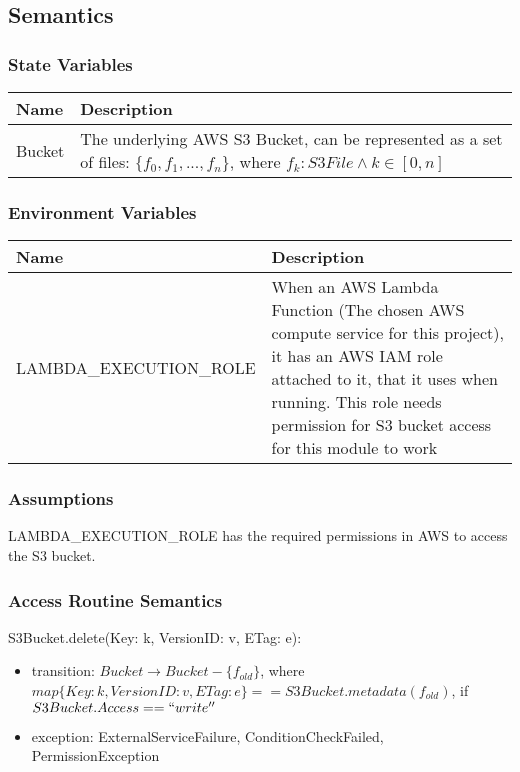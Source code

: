 \documentclass[12pt, titlepage]{article}
\begin{document}
\subsection{Semantics}

\subsubsection{State Variables}

\begin{center}
  \begin{tabular}{p{4cm} p{12cm}}
    \hline
    \textbf{Name} & \textbf{Description} \\
    \hline
    Bucket & The underlying AWS S3 Bucket, can be represented
    as a set of files: $\{f_0, f_1, ..., f_n\}$, where $f_k: S3File
    \land k\in[0,n]$ \\
    \hline
  \end{tabular}
\end{center}

\subsubsection{Environment Variables}

\begin{center}
  \begin{tabular}{p{6cm} p{10cm}}
    \hline
    \textbf{Name} & \textbf{Description} \\
    \hline
    LAMBDA\_EXECUTION\_ROLE & When an AWS Lambda Function (The chosen
    AWS compute service for this project), it has an AWS IAM role
    attached to it, that it uses when running. This role needs
    permission for S3 bucket access for this module to work \\
    \hline
  \end{tabular}
\end{center}

\subsubsection{Assumptions}

LAMBDA\_EXECUTION\_ROLE has the required permissions in AWS to access
the S3 bucket.

\subsubsection{Access Routine Semantics}

\noindent S3Bucket.delete(Key: k, VersionID: v, ETag: e):
\begin{itemize}
  \item transition: $Bucket \rightarrow Bucket - \{f_{old}\}$, where
    $map\{Key: k, VersionID: v, ETag:
    e\}==S3Bucket.metadata(f_{old})$, if $S3Bucket.Access == ``write''$
  \item exception: ExternalServiceFailure, ConditionCheckFailed,
    PermissionException
\end{itemize}
\end{document}
